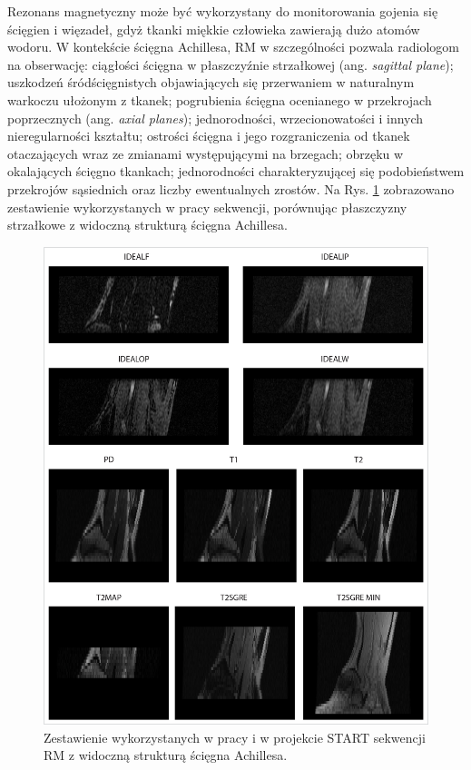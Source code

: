 Rezonans magnetyczny może być wykorzystany do monitorowania gojenia się ścięgien i więzadeł, gdyż tkanki miękkie człowieka zawierają dużo atomów wodoru. W kontekście ścięgna Achillesa, RM w szczególności pozwala radiologom na obserwację: ciągłości ścięgna w płaszczyźnie strzałkowej (ang. \textit{sagittal plane}); uszkodzeń śródścięgnistych objawiających się przerwaniem w naturalnym warkoczu ułożonym \linebreak z tkanek; pogrubienia ścięgna ocenianego w przekrojach poprzecznych (ang. \textit{axial planes}); jednorodności, wrzecionowatości i innych nieregularności kształtu; ostrości ścięgna i jego rozgraniczenia od tkanek otaczających wraz ze zmianami występującymi na brzegach; obrzęku w okalających ścięgno tkankach; jednorodności charakteryzującej się podobieństwem przekrojów sąsiednich oraz liczby ewentualnych zrostów. Na Rys. \ref{sagittalAchillesComp} zobrazowano zestawienie wykorzystanych w pracy sekwencji, porównując płaszczyzny strzałkowe z widoczną strukturą ścięgna Achillesa.  
\begin{figure}[]
	\centering
	\includegraphics[width=1\textwidth]{figures/sciegno.jpg}
	\caption{Zestawienie wykorzystanych w pracy i w projekcie START sekwencji RM z widoczną strukturą ścięgna Achillesa.}
	\label{sagittalAchillesComp}
\end{figure}

